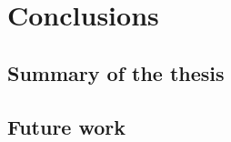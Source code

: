 \chapter{Conclusions}
\label{chapterlabel6}

\section{Summary of the thesis}
\section{Future work}

\blindtext
